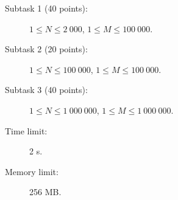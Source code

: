 \documentclass{boi2014}
\begin{document}
    \Scoring

    \begin{description}
        \item[Subtask 1 (40 points):] $1 \le N \le 2\ 000$, $1 \le M \le 100\ 000$.
        \item[Subtask 2 (20 points):] $1 \le N \le 100\ 000$, $1 \le M \le 100\ 000$.
        \item[Subtask 3 (40 points):] $1 \le N \le 1\ 000\ 000$, $1 \le M \le 1\ 000\ 000$.
    \end{description}

    \Constraints

    \begin{description}
        \item[Time limit:] 2 s.
        \item[Memory limit:] 256 MB.
    \end{description}
\end{document}
